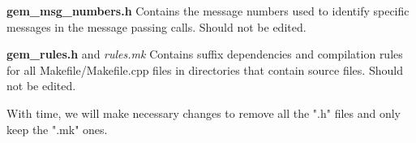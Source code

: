 \vskip 0.5cm
\noindent
{\bf gem\_msg\_numbers.h}
\newline
Contains the message numbers used to identify specific
messages in the message passing calls.
Should not be edited.

\vskip 0.5cm
\noindent
{\bf gem\_rules.h} and {\em rules.mk}
\newline
Contains suffix dependencies and compilation rules for all
Makefile/Makefile.cpp files in directories that contain source files.
Should not be edited.

\vskip 0.5cm
\noindent
With time, we will make necessary changes to remove all the ".h" files and
only keep the ".mk" ones.
